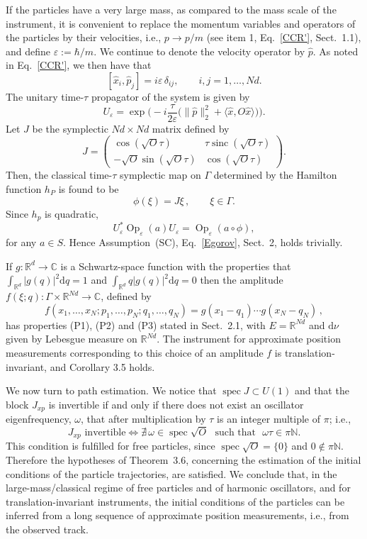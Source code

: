 \documentclass[11pt]{article}
\begin{document}
If the particles have a very large mass, as compared to the mass scale of the instrument, it is convenient to replace 
the momentum variables and operators of the particles by their velocities, i.e., $p\to p/m$ (see item 1, 
Eq.~\eqref{CCR'}, Sect.~1.1), and define $\varepsilon:=\hbar/m$. We continue to denote the velocity operator 
by $\hat{p}$. As noted in Eq.~\eqref{CCR'}, we then have that
$$[\hat x_i, \hat p_j]=i\varepsilon \,\delta_{ij}, \qquad i,j=1,\dots, Nd.$$
The unitary time-$\tau$ propagator of the system is given by
$$U_\varepsilon=\exp\Big(-i \frac{\tau}{2\varepsilon} \big(\| \hat p\|_2^2+
\langle \hat x,O \hat x \rangle\big)\Big).$$
Let $J$ be the symplectic $Nd\times Nd$ matrix defined by
$$J=\begin{pmatrix}
	\cos(\sqrt{O}\tau) & \tau\operatorname{sinc}(\sqrt{O}\tau)\\
	-\sqrt{O}\sin(\sqrt{O}\tau) & \cos(\sqrt{O}\tau)
\end{pmatrix}.$$
Then, the classical time-$\tau$ symplectic map on $\Gamma$ determined by the Hamilton function $h_P$ is found to be
$$\phi(\xi)=J\xi\,, \qquad \xi \in \Gamma.$$
Since $h_p$ is quadratic,
$$U_\varepsilon^*\operatorname{Op}_{\varepsilon}(a)U_\varepsilon=\operatorname{Op}_{\varepsilon}(a\circ\phi),$$
for any $a\in S$. Hence Assumption~(SC), Eq.~\eqref{Egorov}, Sect.~2, holds trivially.

\medskip
If $g:\mathbb{R}^{d}\to\mathbb C$ is a Schwartz-space function with the properties that $\int_{\mathbb R^d}|g(q)|^2\text{d} q=1$ 
and $\int_{\mathbb R^d} q|g(q)|^2\text{d} q=0$ then the amplitude $f(\xi;q):\Gamma\times \mathbb R^{Nd}\to \mathbb C$, 
defined by 
$$f(x_1,\dotsc,x_N; p_1,\dotsc, p_N; q_1,\dotsc, q_N)=g(x_1-q_1)\dotsb g(x_N-q_N)\,,$$ 
has properties (P1), (P2) and (P3) stated in Sect.~2.1, with $E=\mathbb R^{Nd}$ and $\text{d}\nu$ 
given by Lebesgue measure on $\mathbb R^{Nd}$. The instrument for approximate position measurements 
corresponding to this choice of an amplitude $f$ is translation-invariant, and Corollary 3.5 holds. 

We now turn to path estimation. We notice that $\operatorname{spec}J\subset U(1)$ and that the block $J_{xp}$ is 
invertible if and only if there does not exist an oscillator eigenfrequency, $\omega$, that after multiplication by $\tau$
is an integer multiple of $\pi$; i.e.,
$$J_{xp}\mbox{ invertible}\iff\nexists\, \omega\in \operatorname{spec}\sqrt{O}\,\,\mbox{ such that }\,\, \omega\tau\in \pi\mathbb 
N.$$
This condition is fulfilled for free particles, since $\operatorname{spec}\sqrt{O}=\{0\}$ and $0\notin \pi\mathbb N$. 
Therefore the hypotheses of Theorem~3.6, concerning the estimation of the initial conditions of the particle trajectories, 
are satisfied. We conclude that, in the large-mass/classical regime of free particles and of harmonic oscillators, and for 
translation-invariant instruments, the initial conditions of the particles can be inferred from a long sequence of approximate position measurements, i.e., from the observed track. 
\end{document}
